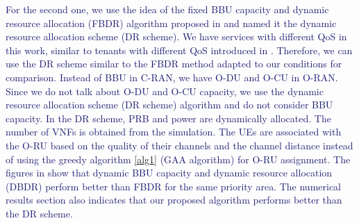\documentclass[lettersize,journal]{IEEEtran}
\begin{document}
\textcolor{MidnightBlue}{For the second one, we use the idea of the fixed BBU capacity and dynamic resource allocation (FBDR) algorithm proposed in \cite{lee2018dynamic} and named it the dynamic resource allocation scheme (DR scheme). 
 We have services with different QoS in this work, similar to tenants with different QoS introduced in \cite{lee2018dynamic}. Therefore, we can use the DR scheme similar to the FBDR method adapted to our conditions for comparison. Instead of BBU in C-RAN, we have O-DU and O-CU in O-RAN.
 Since we do not talk about O-DU and O-CU capacity, we use the dynamic resource allocation scheme (DR scheme) algorithm and do not consider BBU capacity.
 In the DR scheme, PRB and power are dynamically allocated. The number of VNFs is obtained from the simulation. The UEs are associated with the O-RU based on the quality of their channels and the channel distance instead of using the greedy algorithm \ref{alg1} (GAA algorithm) for O-RU assignment. The figures in \cite{lee2018dynamic} show that dynamic BBU capacity and dynamic resource allocation (DBDR) perform better than FBDR for the same priority area. The numerical results section also indicates that our proposed algorithm performs better than the DR scheme.}
\end{document}
